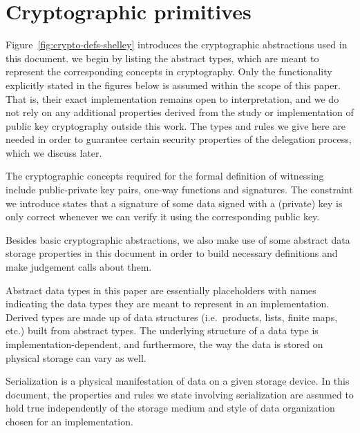 \section{Cryptographic primitives}
\label{sec:crypto-primitives-shelley}

Figure~\ref{fig:crypto-defs-shelley} introduces the cryptographic abstractions used in
this document. we begin by listing the abstract types, which are meant to
represent the corresponding concepts in cryptography. Only the functionality
explicitly stated in the figures below is assumed within the scope of this paper.
That is, their exact
implementation remains open to interpretation, and we do not rely on
any additional properties derived from the study or implementation of public key
cryptography outside this work. The types and rules we give here are needed in
order to guarantee certain security properties of the delegation process, which
we discuss later.

The cryptographic concepts required for the formal definition
of witnessing include public-private key pairs, one-way functions
and signatures. The constraint we introduce states that a signature of
some data signed with a (private) key is only correct whenever we can verify
it using the corresponding public key.

Besides basic cryptographic abstractions, we also make use of some abstract
data storage properties in this document in order to build necessary definitions
and make judgement calls about them.

Abstract data types in this paper are essentially placeholders with names
indicating the data types they are meant to represent in an implementation.
Derived types are made up of data structures (i.e.~products, lists, finite
maps, etc.) built from abstract types. The underlying structure of a data type
is implementation-dependent, and furthermore, the way the data is stored on
physical storage can vary as well.

Serialization is a physical manifestation of data on a given storage device.
In this document, the properties and rules we state involving serialization are
assumed to hold true independently of the storage medium and style of data
organization chosen for an implementation.

